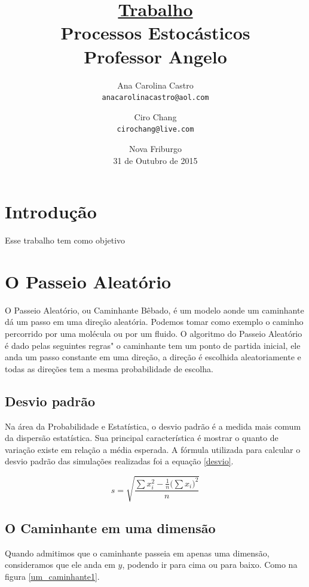 \documentclass[12pt,a4paper]{article}
\title{\textbf{\underline{Trabalho}\\[0.5cm]
Processos Estocásticos}\\[0.3cm]\large{Professor Angelo}\\[1.5cm]}
\author{
	Ana Carolina Castro\\
	\texttt{anacarolinacastro@aol.com}
	\and
	Ciro Chang\\
	\texttt{cirochang@live.com}
	\\[1.5cm]
}
\date{Nova Friburgo\\31 de Outubro de 2015}
\begin{document}
\maketitle
\thispagestyle{empty}

\newpage
\tableofcontents

\newpage
\section{Introdução}
Esse trabalho tem como objetivo 

\newpage
\section{O Passeio Aleatório}
O Passeio Aleatório, ou Caminhante Bêbado, é um modelo aonde um caminhante dá um passo em uma direção aleatória. Podemos tomar como exemplo o caminho percorrido por uma molécula ou por um fluido. O algoritmo do Passeio Aleatório é dado pelas seguintes regras" o caminhante tem um ponto de partida inicial, ele anda um passo constante em uma direção, a direção é escolhida aleatoriamente e todas as direções tem a mesma probabilidade de escolha.



\subsection{Desvio padrão}
Na área da Probabilidade e Estatística, o desvio padrão é a medida mais comum da dispersão estatística. Sua principal característica é mostrar o quanto de variação existe em relação a média esperada. A fórmula utilizada para calcular o desvio padrão das simulações realizadas foi a equação \ref{desvio}.

\begin{equation}
\label{desvio}
s = \sqrt{\frac{\sum{x_i^2} - \frac{1}{n}(\sum{x_i)^2}}{n}}
\end{equation}

\subsection{O Caminhante em uma dimensão}
Quando admitimos que o caminhante passeia em apenas uma dimensão, consideramos que ele anda em $y$, podendo ir para cima ou para baixo. Como na figura \ref{um_caminhante1}.
\end{document}
